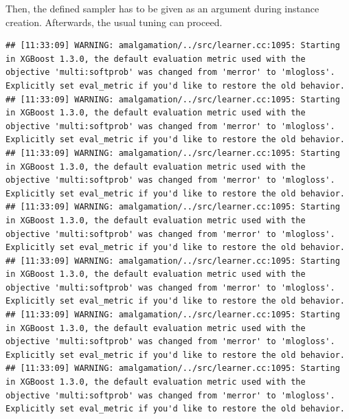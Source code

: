 \documentclass[
]{scrbook}
\newenvironment{Shaded}{\begin{snugshade}}{\end{snugshade}}
\newcommand{\AttributeTok}[1]{\textcolor[rgb]{0.77,0.63,0.00}{#1}}
\newcommand{\DecValTok}[1]{\textcolor[rgb]{0.00,0.00,0.81}{#1}}
\newcommand{\FunctionTok}[1]{\textcolor[rgb]{0.00,0.00,0.00}{#1}}
\newcommand{\NormalTok}[1]{#1}
\newcommand{\OtherTok}[1]{\textcolor[rgb]{0.56,0.35,0.01}{#1}}
\newcommand{\SpecialCharTok}[1]{\textcolor[rgb]{0.00,0.00,0.00}{#1}}
\newcommand{\StringTok}[1]{\textcolor[rgb]{0.31,0.60,0.02}{#1}}
\renewenvironment{Shaded} {\begin{snugshade}\small} {\end{snugshade}}
\begin{document}
Then, the defined sampler has to be given as an argument during instance creation.
Afterwards, the usual tuning can proceed.

\begin{Shaded}
\end{Shaded}

\begin{verbatim}
## [11:33:09] WARNING: amalgamation/../src/learner.cc:1095: Starting in XGBoost 1.3.0, the default evaluation metric used with the objective 'multi:softprob' was changed from 'merror' to 'mlogloss'. Explicitly set eval_metric if you'd like to restore the old behavior.
## [11:33:09] WARNING: amalgamation/../src/learner.cc:1095: Starting in XGBoost 1.3.0, the default evaluation metric used with the objective 'multi:softprob' was changed from 'merror' to 'mlogloss'. Explicitly set eval_metric if you'd like to restore the old behavior.
## [11:33:09] WARNING: amalgamation/../src/learner.cc:1095: Starting in XGBoost 1.3.0, the default evaluation metric used with the objective 'multi:softprob' was changed from 'merror' to 'mlogloss'. Explicitly set eval_metric if you'd like to restore the old behavior.
## [11:33:09] WARNING: amalgamation/../src/learner.cc:1095: Starting in XGBoost 1.3.0, the default evaluation metric used with the objective 'multi:softprob' was changed from 'merror' to 'mlogloss'. Explicitly set eval_metric if you'd like to restore the old behavior.
## [11:33:09] WARNING: amalgamation/../src/learner.cc:1095: Starting in XGBoost 1.3.0, the default evaluation metric used with the objective 'multi:softprob' was changed from 'merror' to 'mlogloss'. Explicitly set eval_metric if you'd like to restore the old behavior.
## [11:33:09] WARNING: amalgamation/../src/learner.cc:1095: Starting in XGBoost 1.3.0, the default evaluation metric used with the objective 'multi:softprob' was changed from 'merror' to 'mlogloss'. Explicitly set eval_metric if you'd like to restore the old behavior.
## [11:33:09] WARNING: amalgamation/../src/learner.cc:1095: Starting in XGBoost 1.3.0, the default evaluation metric used with the objective 'multi:softprob' was changed from 'merror' to 'mlogloss'. Explicitly set eval_metric if you'd like to restore the old behavior.

\end{verbatim}
\end{document}
